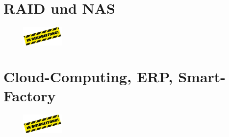 \documentclass[a4paper]{article}
\begin{document}
    \section{RAID und NAS}\label{sec:raid-und-nas}
    \begin{center}
        \begin{figure}[H]
            \centering
            \includegraphics[height=1cm]{media/s_111}\label{fig:bearb5}
        \end{figure}
    \end{center}

    \section{Cloud-Computing, ERP, Smart-Factory}\label{sec:cloud-computing-erp-smart-factory}

    \begin{center}
        \begin{figure}[H]
            \centering
            \includegraphics[height=1cm]{media/s_111}\label{fig:bearb6}
        \end{figure}
    \end{center}
\end{document}
